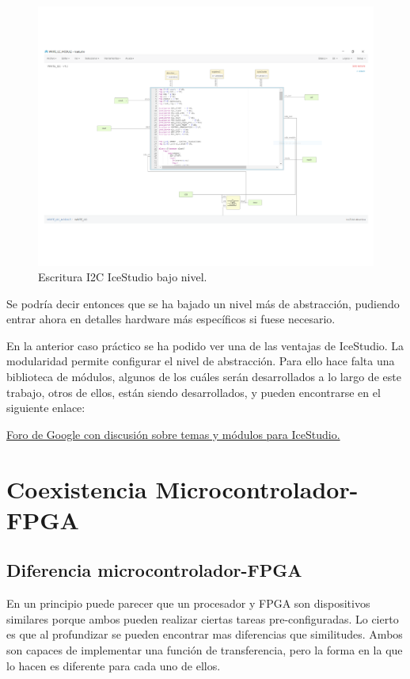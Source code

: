 \begin{figure}[H]
	\center
	\includegraphics[trim = 0mm 1.5cm 0mm 0mm, clip,scale=0.4]{imagenes/EstadoArte/Write_i2c_module2.pdf}
	\caption{Escritura I2C IceStudio bajo nivel.}
	\label{fig:Write_i2c_module2}
\end{figure}

Se podría decir entonces que se ha bajado un nivel más de abstracción, pudiendo entrar ahora en detalles hardware más específicos si fuese necesario. \newline

En la anterior caso práctico se ha podido ver una de las ventajas de IceStudio. La modularidad permite configurar el nivel de abstracción.
Para ello hace falta una biblioteca de módulos, algunos de los cuáles serán desarrollados a lo largo de este trabajo, otros de ellos, están siendo desarrollados, y pueden encontrarse en el siguiente enlace: 

\href{https://groups.google.com/forum/#!topic/fpga-wars-explorando-el-lado-libre/I3ZnqKlfh5M}{Foro de Google con discusión sobre temas y módulos para IceStudio.}


\section{Coexistencia Microcontrolador-FPGA}\label{sec:coexistencia}
\subsection{Diferencia microcontrolador-FPGA}
En un principio puede parecer que un procesador y FPGA son dispositivos similares porque ambos pueden realizar ciertas tareas pre-configuradas. Lo cierto es que al profundizar se pueden encontrar mas diferencias que similitudes. Ambos son capaces de implementar una función de transferencia, pero la forma en la que lo hacen es diferente para cada uno de ellos.\newline

